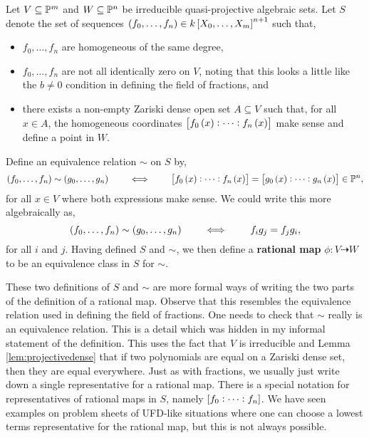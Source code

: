 \begin{definition*}
Let $ V \subseteq \mathbb{P}^m $ and $ W \subseteq \mathbb{P}^n $ be irreducible quasi-projective algebraic sets. Let $ S $ denote the set of sequences $ \br{f_0, \dots, f_n} \in k\sbr{X_0, \dots, X_m}^{n + 1} $ such that,
\begin{itemize}
\item $ f_0, \dots, f_n $ are homogeneous of the same degree,
\item $ f_0, \dots, f_n $ are not all identically zero on $ V $, noting that this looks a little like the $ b \ne 0 $ condition in defining the field of fractions, and
\item there exists a non-empty Zariski dense open set $ A \subseteq V $ such that, for all $ x \in A $, the homogeneous coordinates $ \sbr{f_0\br{x} : \dots : f_n\br{x}} $ make sense and define a point in $ W $.
\end{itemize}
Define an equivalence relation $ \sim $ on $ S $ by,
$$ \br{f_0, \dots, f_n} \sim \br{g_0, \dots, g_n} \qquad \iff \qquad \sbr{f_0\br{x} : \dots : f_n\br{x}} = \sbr{g_0\br{x} : \dots : g_n\br{x}} \in \PP^n, $$
for all $ x \in V $ where both expressions make sense. We could write this more algebraically as,
$$ \br{f_0, \dots, f_n} \sim \br{g_0, \dots, g_n} \qquad \iff \qquad f_ig_j = f_jg_i, $$
for all $ i $ and $ j $. Having defined $ S $ and $ \sim $, we then define a \textbf{rational map} $ \phi : V \dashrightarrow W $ to be an equivalence class in $ S $ for $ \sim $.
\end{definition*}

These two definitions of $ S $ and $ \sim $ are more formal ways of writing the two parts of the definition of a rational map. Observe that this resembles the equivalence relation used in defining the field of fractions. One needs to check that $ \sim $ really is an equivalence relation. This is a detail which was hidden in my informal statement of the definition. This uses the fact that $ V $ is irreducible and Lemma \ref{lem:projectivedense} that if two polynomials are equal on a Zariski dense set, then they are equal everywhere. Just as with fractions, we usually just write down a single representative for a rational map. There is a special notation for representatives of rational maps in $ S $, namely $ \sbr{f_0 : \dots : f_n} $. We have seen examples on problem sheets of UFD-like situations where one can choose a lowest terms representative for the rational map, but this is not always possible.

\pagebreak

